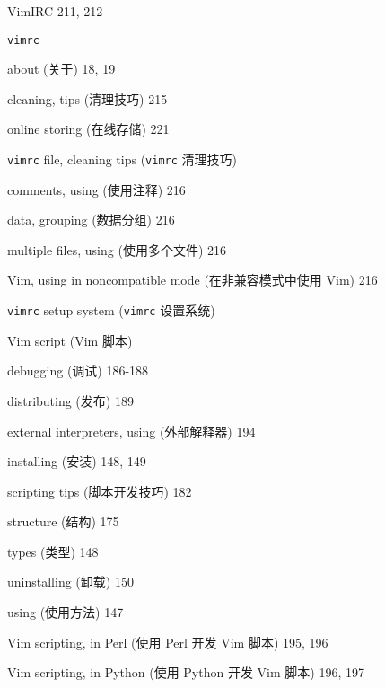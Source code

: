 \begin{multicols}{2}
\hangindent=3pc  VimIRC 211, 212

\hangindent=3pc  \texttt{vimrc} \par
\hangindent=3pc \quad about (关于) 18, 19 \par
\hangindent=3pc \quad cleaning, tips (清理技巧) 215 \par
\hangindent=3pc \quad online storing (在线存储) 221 \par

\hangindent=3pc  \texttt{vimrc} file, cleaning tips (\texttt{vimrc} 清理技巧) \par
\hangindent=3pc \quad comments, using (使用注释) 216 \par
\hangindent=3pc \quad data, grouping (数据分组) 216 \par
\hangindent=3pc \quad multiple files, using (使用多个文件) 216 \par
\hangindent=3pc \quad Vim, using in noncompatible mode (在非兼容模式中使用 Vim) 216 \par

\hangindent=3pc  \texttt{vimrc} setup system (\texttt{vimrc} 设置系统) \par

\hangindent=3pc  Vim script (Vim 脚本) \par
\hangindent=3pc \quad debugging (调试) 186-188 \par
\hangindent=3pc \quad distributing (发布) 189 \par
\hangindent=3pc \quad external interpreters, using (外部解释器) 194 \par
\hangindent=3pc \quad installing (安装) 148, 149 \par
\hangindent=3pc \quad scripting tips (脚本开发技巧) 182 \par
\hangindent=3pc \quad structure (结构) 175 \par
\hangindent=3pc \quad types (类型) 148 \par
\hangindent=3pc \quad uninstalling (卸载) 150 \par
\hangindent=3pc \quad using (使用方法) 147 \par

\hangindent=3pc  Vim scripting, in Perl (使用 Perl 开发 Vim 脚本) 195, 196

\hangindent=3pc  Vim scripting, in Python (使用 Python 开发 Vim 脚本) 196, 197


\end{multicols}
